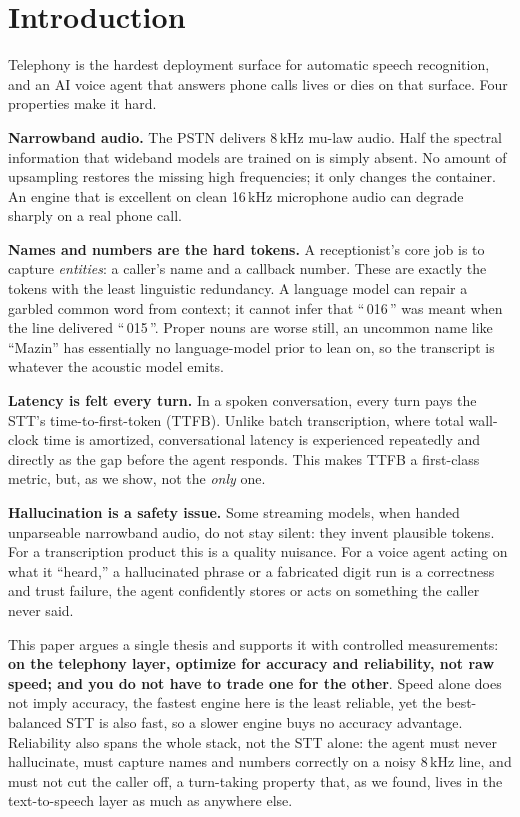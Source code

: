 \documentclass[11pt]{article}
\begin{document}
\section{Introduction}
\label{sec:intro}

Telephony is the hardest deployment surface for automatic speech recognition,
and an AI voice agent that answers phone calls lives or dies on that surface.
Four properties make it hard.

\textbf{Narrowband audio.} The PSTN delivers 8\,kHz mu-law audio. Half the
spectral information that wideband models are trained on is simply absent. No
amount of upsampling restores the missing high frequencies; it only changes the
container. An engine that is excellent on clean 16\,kHz microphone audio can
degrade sharply on a real phone call.

\textbf{Names and numbers are the hard tokens.} A receptionist's core job is to
capture \emph{entities}: a caller's name and a callback number. These are
exactly the tokens with the least linguistic redundancy. A language model can
repair a garbled common word from context; it cannot infer that ``\,016\,'' was
meant when the line delivered ``\,015\,''. Proper nouns are worse still, an
uncommon name like ``Mazin'' has essentially no language-model prior to lean
on, so the transcript is whatever the acoustic model emits.

\textbf{Latency is felt every turn.} In a spoken conversation, every turn pays
the STT's time-to-first-token (TTFB). Unlike batch transcription, where total
wall-clock time is amortized, conversational latency is experienced repeatedly
and directly as the gap before the agent responds. This makes TTFB a
first-class metric, but, as we show, not the \emph{only} one.

\textbf{Hallucination is a safety issue.} Some streaming models, when handed
unparseable narrowband audio, do not stay silent: they invent plausible tokens.
For a transcription product this is a quality nuisance. For a voice agent acting
on what it ``heard,'' a hallucinated phrase or a fabricated digit run is a
correctness and trust failure, the agent confidently stores or acts on
something the caller never said.

This paper argues a single thesis and supports it with controlled
measurements: \textbf{on the telephony layer, optimize for accuracy and
reliability, not raw speed; and you do not have to trade one for the other}.
Speed alone does not imply accuracy, the fastest engine here is the least
reliable, yet the best-balanced STT is also fast, so a slower engine buys no
accuracy advantage. Reliability also spans the whole stack, not the STT alone:
the agent must never hallucinate, must capture names and numbers correctly on a
noisy 8\,kHz line, and must not cut the caller off, a turn-taking property that,
as we found, lives in the text-to-speech layer as much as anywhere else.
\end{document}
